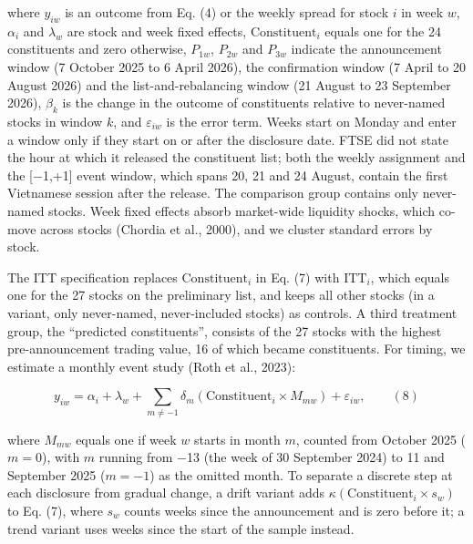 \documentclass[review,authoryear,12pt]{elsarticle}
\begin{document}
where \(y_{iw}\) is an outcome from Eq. (4) or the weekly spread for
stock \(i\) in week \(w\), \(\alpha_i\) and \(\lambda_w\) are stock and
week fixed effects, \(\mathrm{Constituent}_i\) equals one for the 24
constituents and zero otherwise, \(P_{1w}\), \(P_{2w}\) and \(P_{3w}\)
indicate the announcement window (7 October 2025 to 6 April 2026), the
confirmation window (7 April to 20 August 2026) and the
list-and-rebalancing window (21 August to 23 September 2026),
\(\beta_k\) is the change in the outcome of constituents relative to
never-named stocks in window \(k\), and \(\varepsilon_{iw}\) is the
error term. Weeks start on Monday and enter a window only if they start
on or after the disclosure date. FTSE did not state the hour at which it
released the constituent list; both the weekly assignment and the
{[}−1,+1{]} event window, which spans 20, 21 and 24 August, contain the
first Vietnamese session after the release. The comparison group
contains only never-named stocks. Week fixed effects absorb market-wide
liquidity shocks, which co-move across stocks (Chordia et al., 2000),
and we cluster standard errors by stock.

The ITT specification replaces \(\mathrm{Constituent}_i\) in Eq. (7)
with \(\mathrm{ITT}_i\), which equals one for the 27 stocks on the
preliminary list, and keeps all other stocks (in a variant, only
never-named, never-included stocks) as controls. A third treatment
group, the ``predicted constituents'', consists of the 27 stocks with
the highest pre-announcement trading value, 16 of which became
constituents. For timing, we estimate a monthly event study (Roth et
al., 2023):

\[y_{iw} = \alpha_i + \lambda_w + \sum_{m \neq -1}\delta_m\left(\mathrm{Constituent}_i \times M_{mw}\right) + \varepsilon_{iw}, \qquad (8)\]

where \(M_{mw}\) equals one if week \(w\) starts in month \(m\), counted
from October 2025 (\(m = 0\)), with \(m\) running from −13 (the week of
30 September 2024) to 11 and September 2025 (\(m = -1\)) as the omitted
month. To separate a discrete step at each disclosure from gradual
change, a drift variant adds
\(\kappa\left(\mathrm{Constituent}_i \times s_w\right)\) to Eq. (7),
where \(s_w\) counts weeks since the announcement and is zero before it;
a trend variant uses weeks since the start of the sample instead.
\end{document}
